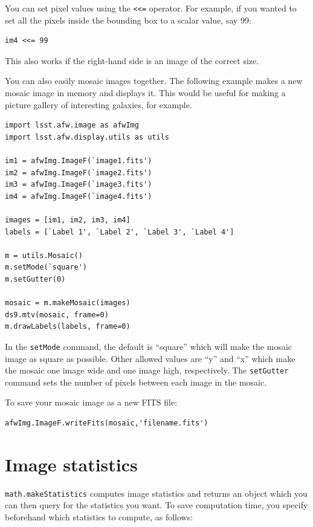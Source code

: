 You can set pixel values using the \texttt{<<=} operator.  For
example, if you wanted to set all the pixels inside the bounding box to a
scalar value, say 99:

\begin{verbatim}
im4 <<= 99
\end{verbatim}

This also works if the right-hand side is an image of the correct size.

You can also easily mosaic images together.  The following example
makes a new mosaic image in memory and displays it.  This would be
useful for making a picture gallery of interesting galaxies, for
example.

\begin{verbatim}
import lsst.afw.image as afwImg
import lsst.afw.display.utils as utils

im1 = afwImg.ImageF(`image1.fits')
im2 = afwImg.ImageF(`image2.fits')
im3 = afwImg.ImageF(`image3.fits')
im4 = afwImg.ImageF(`image4.fits')

images = [im1, im2, im3, im4]
labels = [`Label 1', `Label 2', `Label 3', `Label 4']

m = utils.Mosaic()
m.setMode(`square')
m.setGutter(0)

mosaic = m.makeMosaic(images)
ds9.mtv(mosaic, frame=0)
m.drawLabels(labels, frame=0)
\end{verbatim}

In the \texttt{setMode} command, the default is ``square'' which will
make the mosaic image as square as possible.  Other allowed values are
``y'' and ``x'' which make the mosaic one image wide and one image
high, respectively.  The \texttt{setGutter} command sets the number of
pixels between each image in the mosaic.

To save your mosaic image as a new FITS file:

\begin{verbatim}
afwImg.ImageF.writeFits(mosaic,'filename.fits')
\end{verbatim}


\section{Image statistics}

\texttt{math.makeStatistics} computes image statistics and returns an
object which you can then query for the statistics you want.  To save
computation time, you specify beforehand which statistics to compute,
as follows:

